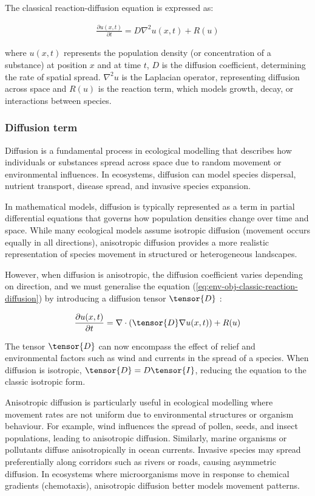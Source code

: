 The classical reaction-diffusion equation is expressed as:

\begin{align}
    \label{eq:env-obj-classic-reaction-diffusion}
    \frac{\partial u (x, t)}{\partial t} = D \nabla^2 u(x, t) + R(u)
\end{align}

where $u(x,t)$ represents the population density (or concentration of a substance) at position $x$ and at time $t$, $D$ is the diffusion coefficient, determining the rate of spatial spread. $\nabla^2 u$ is the Laplacian operator, representing diffusion across space and $R(u)$ is the reaction term, which models growth, decay, or interactions between species.

\subsubsection{Diffusion term}
Diffusion is a fundamental process in ecological modelling that describes how individuals or substances spread across space due to random movement or environmental influences. In ecosystems, diffusion can model species dispersal, nutrient transport, disease spread, and invasive species expansion.

In mathematical models, diffusion is typically represented as a term in partial differential equations that governs how population densities change over time and space. While many ecological models assume isotropic diffusion (movement occurs equally in all directions), anisotropic diffusion provides a more realistic representation of species movement in structured or heterogeneous landscapes.

However, when diffusion is anisotropic, the diffusion coefficient varies depending on direction, and we must generalise the equation (\cref{eq:env-obj-classic-reaction-diffusion}) by introducing a diffusion tensor $\tensor{D}$ \cite{Ramos2024}:

\begin{align}
    \label{eq:env-obj-reaction-diffusion}
    \frac{\partial u (x, t)}{\partial t} = \nabla \cdot (\tensor{D} \nabla u(x, t)) + R(u)
\end{align}

The tensor $\tensor{D}$ can now encompass the effect of relief and environmental factors such as wind and currents in the spread of a species. When diffusion is isotropic, $\tensor{D} = D\tensor{I}$, reducing the equation to the classic isotropic form.

Anisotropic diffusion is particularly useful in ecological modelling where movement rates are not uniform due to environmental structures or organism behaviour. For example, wind influences the spread of pollen, seeds, and insect populations, leading to anisotropic diffusion. Similarly, marine organisms or pollutants diffuse anisotropically in ocean currents.
Invasive species may spread preferentially along corridors such as rivers or roads, causing asymmetric diffusion. In ecosystems where microorganisms move in response to chemical gradients (chemotaxis), anisotropic diffusion better models movement patterns.

